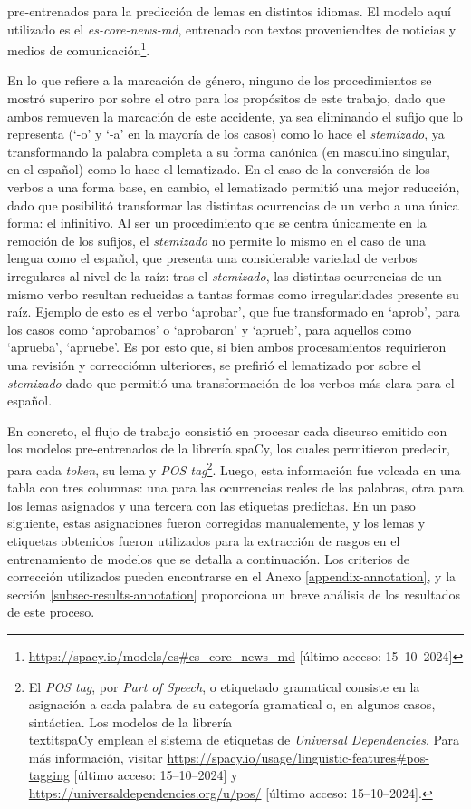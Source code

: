 pre-entrenados para la predicci\'on de lemas en distintos idiomas. El modelo aqu\'i
utilizado es el \textit{es-core-news-md}, entrenado con textos
proveniendtes de noticias y medios de
comunicaci\'on\footnote{\url{https://spacy.io/models/es\#es_core_news_md}
[\'ultimo acceso: 15--10--2024]}.
\par
En lo que refiere a la marcaci\'on de g\'enero, ninguno de los procedimientos se mostr\'o
superiro por sobre el otro para los prop\'ositos de este trabajo, dado que ambos
remueven la marcaci\'on de este accidente, ya sea eliminando el sufijo que lo
representa (`-o' y `-a' en la mayor\'ia de los casos) como lo hace el
\textit{stemizado}, ya transformando la palabra completa a su forma can\'onica
(en masculino singular, en el español) como lo hace el lematizado. En el caso
de la conversi\'on de los verbos a una forma base, en cambio, el lematizado permiti\'o
una mejor reducci\'on, dado que posibilit\'o transformar las distintas ocurrencias
de un verbo a una \'unica forma: el infinitivo. Al ser un procedimiento que se
centra \'unicamente en la remoci\'on de los sufijos, el \textit{stemizado} no permite
lo mismo en el caso de una lengua como el español, que presenta una considerable
variedad de verbos irregulares al nivel de la ra\'iz: tras el
\textit{stemizado}, las distintas ocurrencias de un mismo verbo resultan reducidas
a tantas formas como irregularidades presente su ra\'iz. Ejemplo de esto es el
verbo `aprobar', que fue transformado en `aprob', para los casos como
`aprobamos' o `aprobaron' y `aprueb', para aquellos como `aprueba',
`apruebe'. Es por esto que, si bien ambos procesamientos requirieron una revisi\'on
y correcci\'omn ulteriores, se prefiri\'o el lematizado por sobre el \textit{stemizado}
dado que permiti\'o una transformaci\'on de los verbos m\'as clara para el español.
\par
En concreto, el flujo de trabajo consisti\'o en procesar cada discurso emitido
con los modelos pre-entrenados de la librer\'ia spaCy, los cuales permitieron
predecir, para cada \textit{token}, su lema y \textit{POS tag}\footnote{El
\textit{POS tag}, por \textit{Part of Speech}, o etiquetado gramatical consiste
en la asignaci\'on a cada palabra de su categor\'ia gramatical o, en algunos casos,
sint\'actica. Los modelos de la
librer\'ia \\textit{spaCy} emplean el sistema de etiquetas de \textit{Universal Dependencies}.
Para m\'as informaci\'on, visitar
\url{https://spacy.io/usage/linguistic-features\#pos-tagging}
[\'ultimo acceso: 15--10--2024]
y \url{https://universaldependencies.org/u/pos/}
[\'ultimo acceso: 15--10--2024].}. Luego, esta
informaci\'on fue volcada en una tabla con tres columnas: una para las ocurrencias
reales de las palabras, otra para los lemas asignados y una tercera con las etiquetas predichas. En un paso siguiente, estas asignaciones fueron corregidas
manualemente, y los lemas y etiquetas obtenidos fueron utilizados para la
extracci\'on de rasgos en el entrenamiento de modelos que se detalla a continuaci\'on.
Los criterios de correcci\'on utilizados pueden encontrarse en el Anexo
\ref{appendix-annotation}, y la secci\'on \ref{subsec-results-annotation}
proporciona un breve an\'alisis de los resultados de este proceso.
